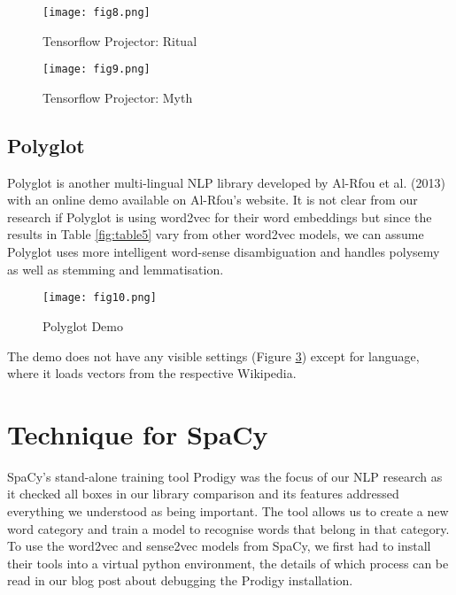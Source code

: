 \documentclass[12pt, usenames, dvipsnames]{report}
\begin{document}
\begin{flushleft}
\vspace*{1.2em}
\begin{figure}[!htbp]
  \hspace*{-3.666em}
  \texttt{[image: fig8.png]}
  \caption{Tensorflow Projector: Ritual}
  \label{fig:figure8}
\end{figure}
\vspace*{1.2em}

\vspace*{1.2em}
\begin{figure}[!htbp]
  \hspace*{-3.666em}
  \texttt{[image: fig9.png]}
  \caption{Tensorflow Projector: Myth}
  \label{fig:figure9}
\end{figure}
\vspace*{1.2em}

\subsection{Polyglot}

Polyglot is another multi-lingual NLP library developed by Al-Rfou et al. (2013) \cite{alrfou2013} with an online demo available on Al-Rfou’s website.
It is not clear from our research if Polyglot is using word2vec for their word embeddings but since the results in Table \ref{fig:table5} vary from other word2vec models, we can assume Polyglot uses more intelligent word-sense disambiguation and handles polysemy as well as stemming and lemmatisation.

\vspace*{1.2em}
\begin{figure}[!htbp]
  \hspace*{-3.666em}
  \texttt{[image: fig10.png]}
  \caption{Polyglot Demo}
  \label{fig:figure10}
\end{figure}
\vspace*{1.2em}

The demo does not have any visible settings (Figure \ref{fig:figure10}) except for language, where it loads vectors from the respective Wikipedia.


\section{Technique for SpaCy}

SpaCy’s stand-alone training tool Prodigy was the focus of our NLP research as it checked all boxes in our library comparison and its features addressed everything we understood as being important.
The tool allows us to create a new word category and train a model to recognise words that belong in that category.
To use the word2vec and sense2vec models from SpaCy, we first had to install their tools into a virtual python environment, the details of which process can be read in our blog post about debugging the Prodigy installation.


\end{flushleft}
\end{document}
